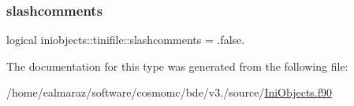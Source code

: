 \mbox{\label{structiniobjects_1_1tinifile_ac47c098d1080f5c8a2ab7081872418f3}} 
\subsubsection{\texorpdfstring{slashcomments}{slashcomments}}
{\footnotesize\ttfamily logical iniobjects\+::tinifile\+::slashcomments = .false.\hspace{0.3cm}{\ttfamily [private]}}



The documentation for this type was generated from the following file\+:\begin{DoxyCompactItemize}
\item 
/home/ealmaraz/software/cosmomc/bde/v3./source/\mbox{\hyperlink{IniObjects_8f90}{Ini\+Objects.\+f90}}\end{DoxyCompactItemize}
